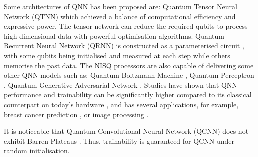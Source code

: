 Some architectures of QNN has been proposed are: 
Quantum Tensor Neural Network (QTNN) \cite{hugginsQuantumMachineLearning2019} which achieved a balance of computational efficiency and expressive power. 
The tensor network can reduce the required qubits to process high-dimensional data with powerful optimisation algorithms.
Quantum Recurrent Neural Network (QRNN) is constructed as a parameterised circuit \cite{takakiLearningTemporalData2021}, with some qubits being initialised and measured at each step while others memorise the past data.
The NISQ processors are also capable of delivering some other QNN models such as: 
Quantum Boltzmann Machine \cite{shinguBoltzmannMachineLearning2021, zoufalVariationalQuantumBoltzmann2021}, 
Quantum Perceptron \cite{kristensenArtificialSpikingQuantum2021}, 
Quantum Generative Adversarial Network \cite{dallaire-demersQuantumGenerativeAdversarial2018, lloydQuantumGenerativeAdversarial2018}. Studies have shown that QNN performance and trainability can be significantly higher compared to its classical counterpart on today's hardware \cite{abbasPowerQuantumNeural2021, colesSeekingQuantumAdvantage2021}, and has several applications, for example, breast cancer prediction \cite{liModelAlgorithmQuantuminspired2014}, or image processing \cite{matsuiQubitNeuralNetwork2009}.

It is noticeable that Quantum Convolutional Neural Network (QCNN) does not exhibit Barren Plateaus \cite{pesahAbsenceBarrenPlateaus2021}.
Thus, trainability is guaranteed for QCNN under random initialisation.
